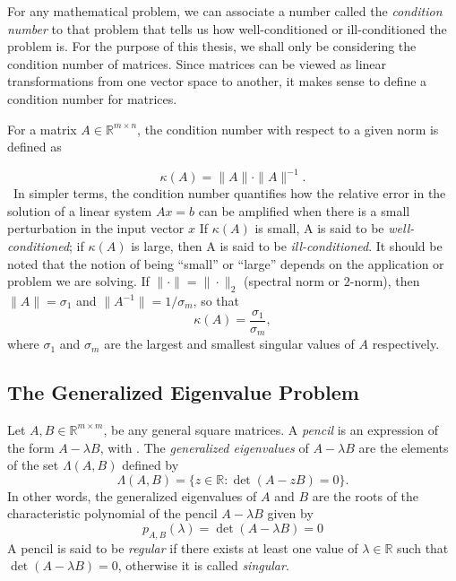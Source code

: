 For any mathematical problem, we can associate a number called the \textit{condition number} to that problem that tells us how well-conditioned or ill-conditioned the problem is. For the purpose of this thesis, we shall only be considering the condition number of matrices. Since matrices can be viewed as linear transformations from one vector space to another, it makes sense to define a condition number for matrices.

For a matrix $A \in \mathbb{R}^{m\times n}$, the condition number with respect to a given norm is defined as

\[\kappa(A) = \|A\| \cdot \|A\|^{-1}.\]\
In simpler terms, the condition number quantifies how the relative error in the solution of a linear system $Ax = b$ can be amplified when there is a small perturbation in the input vector $x$ If $\kappa(A)$ is small, A is said to be \textit{well-conditioned}; if $\kappa(A)$ is large, then A is said to be \textit{ill-conditioned}. It should be noted that the notion of being ``small'' or ``large'' depends on the application or problem we are solving. If $\| \cdot\| = \| \cdot \|_2$ (spectral norm or $2$-norm), then $\|A\| = \sigma_1$ and $\| A^{-1} \| = 1/\sigma_m$, so that
\begin{equation}\label{eq:ConditionNumber}
	\kappa(A) = \frac{\sigma_1}{\sigma_m},
\end{equation}
where $\sigma_1$ and $\sigma_m$ are the largest and smallest singular values of $A$ respectively.

\subsection{The Generalized Eigenvalue Problem}
\label{sec:GeneralizedEigValProblem}

Let $A, B \in \mathbb{R}^{m\times m}$, be any general square matrices. A \textit{pencil} is an expression of the form $A - \lambda B$, with .  The \textit{generalized eigenvalues} of $A - \lambda B$ are the elements of the set $\Lambda(A, B)$ defined by
\begin{equation}\label{eq:GeneralizedEigValDefinition}
	\Lambda(A, B) = \{z \in \mathbb{R}: \det(A-zB) = 0\}.
\end{equation}
In other words, the generalized eigenvalues of $A$ and $B$ are the roots of the characteristic polynomial of the pencil $A- \lambda B$ given by
\begin{equation}\label{eq:GeneralizedXteristicPolynomial}
	p_{A, B}(\lambda) = \det(A-\lambda B) = 0
\end{equation}
A pencil is said to be \textit{regular} if there exists at least one value of $\lambda \in \mathbb{R}$ such that $\det(A-\lambda B) = 0$, otherwise it is called \textit{singular}.

